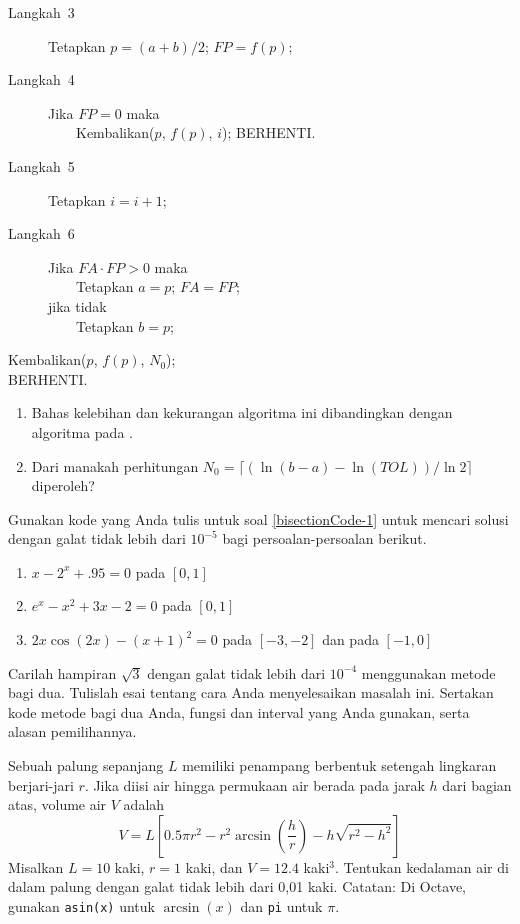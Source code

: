 \begin{enumerate}
\begin{description}
\begin{description}
\item [{Langkah~3}] Tetapkan $p=(a+b)/2$; $FP=f(p)$;
\item [{Langkah~4}] Jika $FP=0$ maka\\
$\qquad$Kembalikan($p$, $f(p)$, $i$); BERHENTI.
\item [{Langkah~5}] Tetapkan $i=i+1$;
\item [{Langkah~6}] Jika $FA\cdot FP>0$ maka\\
$\qquad$Tetapkan $a=p$; $FA=FP$;\\
jika tidak\\
$\qquad$Tetapkan $b=p$;
\end{description}
\item [{Langkah~7}] Kembalikan($p$, $f(p)$, $N_{0}$);\\
BERHENTI.
\end{description}
\begin{enumerate}
\item Bahas kelebihan dan kekurangan algoritma ini dibandingkan dengan algoritma
pada .
\item Dari manakah perhitungan $N_{0}=\lceil(\ln(b-a)-\ln(TOL))/\ln2\rceil$
diperoleh?
\end{enumerate}
\item Gunakan kode yang Anda tulis untuk soal \ref{bisectionCode-1} untuk
mencari solusi dengan galat tidak lebih dari $10^{-5}$ bagi persoalan-persoalan
berikut. 

\begin{enumerate}
\item $x-2^{x}+.95=0$ pada $[0,1]$
\item $e^{x}-x^{2}+3x-2=0$ pada $[0,1]$
\item $2x\cos(2x)-(x+1)^{2}=0$ pada $[-3,-2]$ dan pada $[-1,0]$
\end{enumerate}
\item Carilah hampiran $\sqrt{3}$ dengan galat tidak lebih dari $10^{-4}$
menggunakan metode bagi dua. Tulislah esai tentang cara Anda menyelesaikan
masalah ini. Sertakan kode metode bagi dua Anda, fungsi dan interval
yang Anda gunakan, serta alasan pemilihannya.
\item Sebuah palung sepanjang $L$ memiliki penampang berbentuk setengah
lingkaran berjari-jari $r$. Jika diisi air hingga permukaan air berada
pada jarak $h$ dari bagian atas, volume air $V$ adalah 
\[
V=L\left[0.5\pi r^{2}-r^{2}\arcsin\left(\frac{h}{r}\right)-h\sqrt{r^{2}-h^{2}}\right]
\]
Misalkan $L=10$ kaki, $r=1$ kaki, dan $V=12.4$ kaki$^{3}$. Tentukan
kedalaman air di dalam palung dengan galat tidak lebih dari 0,01 kaki.
Catatan: Di Octave, gunakan \texttt{asin(x)} untuk $\arcsin(x)$ dan
\texttt{pi} untuk $\pi$.
\end{enumerate}
\finishexercises


